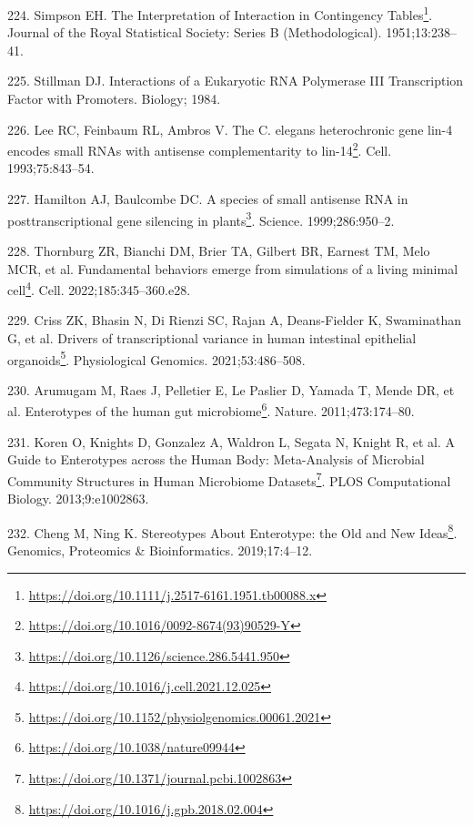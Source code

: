 \documentclass[
  a4paper,
]{book}
\DeclareRobustCommand{\href}[2]{#2\footnote{\url{#1}}}
\newlength{\cslhangindent}
\newlength{\cslentryspacingunit} %
\newenvironment{CSLReferences}[2] %
 {%
  \setlength{\parindent}{0pt}
  \ifodd #1
  \let\oldpar\par
  \def\par{\hangindent=\cslhangindent\oldpar}
  \fi
  \setlength{\parskip}{#2\cslentryspacingunit}
 }%
 {}
\begin{document}
\begin{CSLReferences}{0}{0}
\leavevmode{}%
224. Simpson EH. \href{https://doi.org/10.1111/j.2517-6161.1951.tb00088.x}{The Interpretation of Interaction in Contingency Tables}. Journal of the Royal Statistical Society: Series B (Methodological). 1951;13:238--41.

\leavevmode{}%
225. Stillman DJ. Interactions of a Eukaryotic RNA Polymerase III Transcription Factor with Promoters. Biology; 1984.

\leavevmode{}%
226. Lee RC, Feinbaum RL, Ambros V. \href{https://doi.org/10.1016/0092-8674(93)90529-Y}{The C. elegans heterochronic gene lin-4 encodes small RNAs with antisense complementarity to lin-14}. Cell. 1993;75:843--54.

\leavevmode{}%
227. Hamilton AJ, Baulcombe DC. \href{https://doi.org/10.1126/science.286.5441.950}{A species of small antisense RNA in posttranscriptional gene silencing in plants}. Science. 1999;286:950--2.

\leavevmode{}%
228. Thornburg ZR, Bianchi DM, Brier TA, Gilbert BR, Earnest TM, Melo MCR, et al. \href{https://doi.org/10.1016/j.cell.2021.12.025}{Fundamental behaviors emerge from simulations of a living minimal cell}. Cell. 2022;185:345--360.e28.

\leavevmode{}%
229. Criss ZK, Bhasin N, Di Rienzi SC, Rajan A, Deans-Fielder K, Swaminathan G, et al. \href{https://doi.org/10.1152/physiolgenomics.00061.2021}{Drivers of transcriptional variance in human intestinal epithelial organoids}. Physiological Genomics. 2021;53:486--508.

\leavevmode{}%
230. Arumugam M, Raes J, Pelletier E, Le Paslier D, Yamada T, Mende DR, et al. \href{https://doi.org/10.1038/nature09944}{Enterotypes of the human gut microbiome}. Nature. 2011;473:174--80.

\leavevmode{}%
231. Koren O, Knights D, Gonzalez A, Waldron L, Segata N, Knight R, et al. \href{https://doi.org/10.1371/journal.pcbi.1002863}{A Guide to Enterotypes across the Human Body: Meta-Analysis of Microbial Community Structures in Human Microbiome Datasets}. PLOS Computational Biology. 2013;9:e1002863.

\leavevmode{}%
232. Cheng M, Ning K. \href{https://doi.org/10.1016/j.gpb.2018.02.004}{Stereotypes About Enterotype: the Old and New Ideas}. Genomics, Proteomics \& Bioinformatics. 2019;17:4--12.


\end{CSLReferences}
\end{document}
